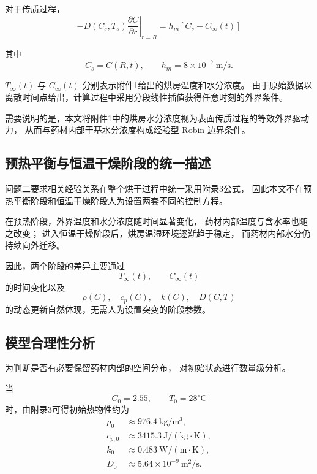 \documentclass[UTF8,a4paper,12pt]{ctexart}
\begin{document}
对于传质过程，
\begin{equation}
\boxed{
-D(C_s,T_s)
\left.
\frac{\partial C}{\partial r}
\right|_{r=R}
=
h_m
\left[
C_s-C_{\infty}(t)
\right]
}
\label{eq:mass_boundary}
\end{equation}

其中
\begin{equation}
C_s=C(R,t),
\qquad
h_m=8\times10^{-7}~\mathrm{m/s}.
\end{equation}

$T_{\infty}(t)$ 与 $C_{\infty}(t)$ 分别表示附件1给出的烘房温度和水分浓度。
由于原始数据以离散时间点给出，计算过程中采用分段线性插值获得任意时刻的外界条件。

需要说明的是，本文将附件1中的烘房水分浓度视为表面传质过程的等效外界驱动力，
从而与药材内部干基水分浓度构成经验型 Robin 边界条件。

\subsection{预热平衡与恒温干燥阶段的统一描述}

问题二要求相关经验关系在整个烘干过程中统一采用附录3公式，
因此本文不在预热平衡阶段和恒温干燥阶段人为设置两套不同的控制方程。

在预热阶段，外界温度和水分浓度随时间显著变化，
药材内部温度与含水率也随之改变；
进入恒温干燥阶段后，烘房温湿环境逐渐趋于稳定，
而药材内部水分仍持续向外迁移。

因此，两个阶段的差异主要通过
\begin{equation}
T_{\infty}(t),\qquad C_{\infty}(t)
\end{equation}
的时间变化以及
\begin{equation}
\rho(C),\quad c_p(C),\quad k(C),\quad D(C,T)
\end{equation}
的动态更新自然体现，无需人为设置突变的阶段参数。

\subsection{模型合理性分析}

为判断是否有必要保留药材内部的空间分布，
对初始状态进行数量级分析。

当
\begin{equation}
C_0=2.55,\qquad T_0=28^\circ\mathrm{C}
\end{equation}
时，由附录3可得初始热物性约为
\begin{align}
\rho_0 &\approx 976.4~\mathrm{kg/m^3},\\
c_{p,0} &\approx 3415.3~\mathrm{J/(kg\cdot K)},\\
k_0 &\approx 0.483~\mathrm{W/(m\cdot K)},\\
D_0 &\approx 5.64\times10^{-9}~\mathrm{m^2/s}.
\end{align}
\end{document}
